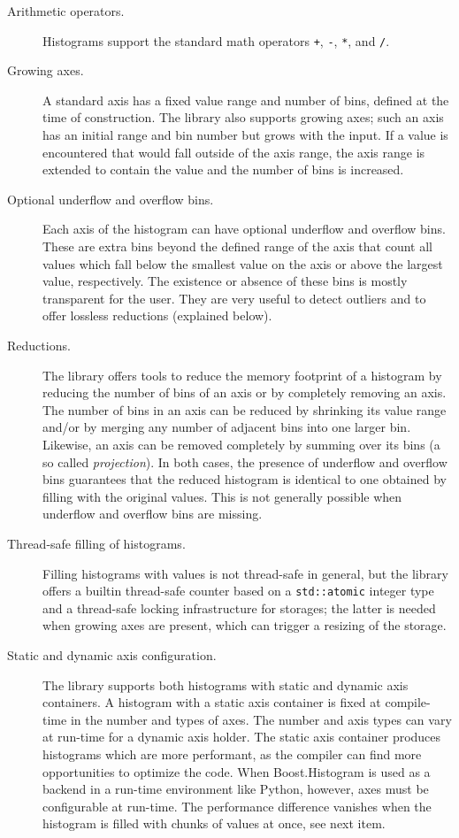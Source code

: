 \documentclass{webofc}
\begin{document}
\begin{description}
\item[Arithmetic operators.] Histograms support the standard math operators \verb|+|, \verb|-|, \verb|*|, and \verb|/|.

\item[Growing axes.] A standard axis has a fixed value range and number of bins, defined at the time of construction. The library also supports growing axes; such an axis has an initial range and bin number but grows with the input. If a value is encountered that would fall outside of the axis range, the axis range is extended to contain the value and the number of bins is increased.

\item[Optional underflow and overflow bins.] Each axis of the histogram can have optional underflow and overflow bins. These are extra bins beyond the defined range of the axis that count all values which fall below the smallest value on the axis or above the largest value, respectively. The existence or absence of these bins is mostly transparent for the user. They are very useful to detect outliers and to offer lossless reductions (explained below).

\item[Reductions.] The library offers tools to reduce the memory footprint of a histogram by reducing the number of bins of an axis or by completely removing an axis. The number of bins in an axis can be reduced by shrinking its value range and/or by merging any number of adjacent bins into one larger bin. Likewise, an axis can be removed completely by summing over its bins (a so called \emph{projection}). In both cases, the presence of underflow and overflow bins guarantees that the reduced histogram is identical to one obtained by filling with the original values. This is not generally possible when underflow and overflow bins are missing.

\item[Thread-safe filling of histograms.] Filling histograms with values is not thread-safe in general, but the library offers a builtin thread-safe counter based on a \verb|std::atomic| integer type and a thread-safe locking infrastructure for storages; the latter is needed when growing axes are present, which can trigger a resizing of the storage.

\item[Static and dynamic axis configuration.] The library supports both histograms with static and dynamic axis containers. A histogram with a static axis container is fixed at compile-time in the number and types of axes. The number and axis types can vary at run-time for a dynamic axis holder. The static axis container produces histograms which are more performant, as the compiler can find more opportunities to optimize the code. When Boost.Histogram is used as a backend in a run-time environment like Python, however, axes must be configurable at run-time. The performance difference vanishes when the histogram is filled with chunks of values at once, see next item.


\end{description}
\end{document}
